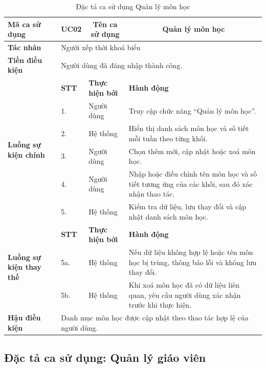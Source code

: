 \documentclass[../DoAn.tex]{subfiles}
\begin{document}
\begin{longtable}{|p{2.8cm}|p{1cm}|p{2.8cm}|p{6.3cm}|}
\caption{Đặc tả ca sử dụng Quản lý môn học}
\label{tab:app_uc_quan_ly_mon_hoc} \\
\hline
\multicolumn{1}{|l|}{\textbf{Mã ca sử dụng}} & \multicolumn{1}{c|}{UC02} &
\multicolumn{1}{c|}{\textbf{Tên ca sử dụng}} & \multicolumn{1}{c|}{Quản lý môn học} \\
\hline
\multicolumn{1}{|l|}{\textbf{Tác nhân}} & \multicolumn{3}{l|}{Người xếp thời khoá biểu} \\
\hline
\multicolumn{1}{|l|}{\textbf{Tiền điều kiện}} & \multicolumn{3}{l|}{Người dùng đã đăng nhập thành công.} \\
\hline
\multirow{6}{2.8cm}{\textbf{Luồng sự kiện chính}} & \textbf{STT} & \textbf{Thực hiện bởi} & \textbf{Hành động} \\
\cline{2-4}
& 1. & Người dùng & Truy cập chức năng ``Quản lý môn học''. \\
\cline{2-4}
& 2. & Hệ thống & Hiển thị danh sách môn học và số tiết mỗi tuần theo từng khối. \\
\cline{2-4}
& 3. & Người dùng & Chọn thêm mới, cập nhật hoặc xoá môn học. \\
\cline{2-4}
& 4. & Người dùng & Nhập hoặc điều chỉnh tên môn học và số tiết tương ứng của các khối, sau đó xác nhận thao tác. \\
\cline{2-4}
& 5. & Hệ thống & Kiểm tra dữ liệu, lưu thay đổi và cập nhật danh sách môn học. \\
\hline
\multirow{3}{2.8cm}{\textbf{Luồng sự kiện thay thế}} & \textbf{STT} & \textbf{Thực hiện bởi} & \textbf{Hành động} \\
\cline{2-4}
& 5a. & Hệ thống & Nếu dữ liệu không hợp lệ hoặc tên môn học bị trùng, thông báo lỗi và không lưu thay đổi. \\
\cline{2-4}
& 5b. & Hệ thống & Khi xoá môn học đã có dữ liệu liên quan, yêu cầu người dùng xác nhận trước khi thực hiện. \\
\hline
\multicolumn{1}{|l|}{\textbf{Hậu điều kiện}} & \multicolumn{3}{p{10.5cm}|}{Danh mục môn học được cập nhật theo thao tác hợp lệ của người dùng.} \\
\hline
\end{longtable}

\subsection{Đặc tả ca sử dụng: Quản lý giáo viên}
\end{document}
